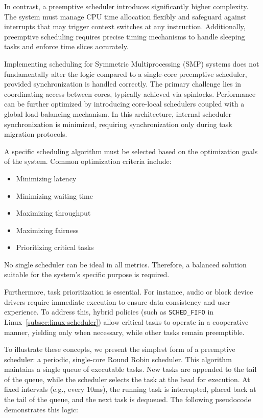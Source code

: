 \documentclass[a4paper,10pt,twoside]{report}
\theoremstyle{definition}
\begin{document}
In contrast, a preemptive scheduler introduces significantly higher complexity. The system must manage CPU time allocation flexibly and safeguard against interrupts that may trigger context switches at any instruction. Additionally, preemptive scheduling requires precise timing mechanisms to handle sleeping tasks and enforce time slices accurately.

Implementing scheduling for Symmetric Multiprocessing (SMP) systems does not fundamentally alter the logic compared to a single-core preemptive scheduler, provided synchronization is handled correctly. The primary challenge lies in coordinating access between cores, typically achieved via spinlocks. Performance can be further optimized by introducing core-local schedulers coupled with a global load-balancing mechanism. In this architecture, internal scheduler synchronization is minimized, requiring synchronization only during task migration protocols.

A specific scheduling algorithm must be selected based on the optimization goals of the system. Common optimization criteria include:

\begin{itemize}
    \item Minimizing latency
    \item Minimizing waiting time
    \item Maximizing throughput
    \item Maximizing fairness
    \item Prioritizing critical tasks
\end{itemize}

No single scheduler can be ideal in all metrics. Therefore, a balanced solution suitable for the system's specific purpose is required. 

Furthermore, task prioritization is essential. For instance, audio or block device drivers require immediate execution to ensure data consistency and user experience. To address this, hybrid policies (such as \texttt{SCHED\_FIFO} in Linux~\ref{subsec:linux-scheduler}) allow critical tasks to operate in a cooperative manner, yielding only when necessary, while other tasks remain preemptible.

To illustrate these concepts, we present the simplest form of a preemptive scheduler: a periodic, single-core Round Robin scheduler. This algorithm maintains a single queue of executable tasks. New tasks are appended to the tail of the queue, while the scheduler selects the task at the head for execution. At fixed intervals (e.g., every 10ms), the running task is interrupted, placed back at the tail of the queue, and the next task is dequeued. The following pseudocode demonstrates this logic:
\end{document}
